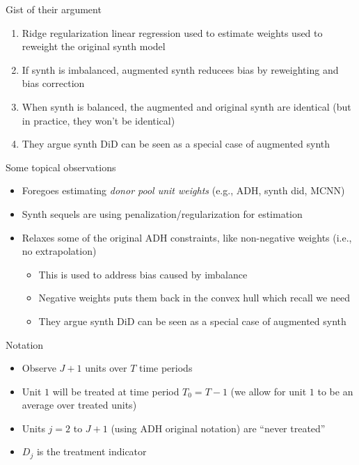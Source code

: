 \documentclass{beamer}
\begin{document}
\begin{frame}{Gist of their argument}

\begin{enumerate}
\item Ridge regularization linear regression used to estimate weights used to reweight the original synth model
\item If synth is imbalanced, augmented synth reducees bias by reweighting and bias correction
\item When synth is balanced, the augmented and original synth are identical (but in practice, they won't be identical)
\item They argue synth DiD can be seen as a special case of augmented synth
\end{enumerate}

\end{frame}


\begin{frame}{Some topical observations}

\begin{itemize}
\item Foregoes estimating \emph{donor pool unit weights} (e.g., ADH, synth did, MCNN)
\item Synth sequels are using penalization/regularization for estimation
\item Relaxes some of the original ADH constraints, like non-negative weights (i.e., no extrapolation)
	\begin{itemize}
	\item This is used to address bias caused by imbalance
	\item Negative weights puts them back in the convex hull which recall we need
	\item They argue synth DiD can be seen as a special case of augmented synth
	\end{itemize}
\end{itemize}

\end{frame}



\begin{frame}{Notation}

\begin{itemize}
\item Observe $J+1$ units over $T$ time periods
\item Unit $1$ will be treated at time period $T_0=T-1$ (we allow for unit $1$ to be an average over treated units)
\item Units $j=2 $ to $J+1$ (using ADH original notation) are ``never treated''
\item $D_j$ is the treatment indicator
\end{itemize}

\end{frame}
\end{document}
